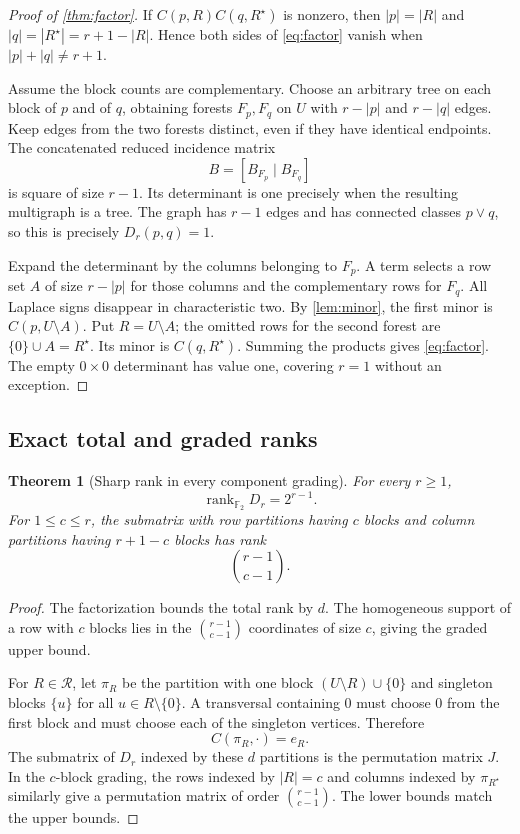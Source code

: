 \documentclass[11pt,a4paper]{article}
\newtheorem{theorem}{Theorem}[section]
\theoremstyle{definition}
\theoremstyle{remark}
\newcommand{\F}{\mathbb F_2}
\newcommand{\rk}{\operatorname{rank}}
\begin{document}
\begin{proof}[Proof of \cref{thm:factor}]
If $C(p,R)C(q,R^\star)$ is nonzero, then
$|p|=|R|$ and $|q|=|R^\star|=r+1-|R|$. Hence both sides of
\eqref{eq:factor} vanish when $|p|+|q|\ne r+1$.

Assume the block counts are complementary. Choose an arbitrary tree on each block
of $p$ and of $q$, obtaining forests $F_p,F_q$ on $U$ with $r-|p|$ and
$r-|q|$ edges. Keep edges from the two forests distinct, even if they have identical
endpoints. The concatenated reduced incidence matrix
\[
                         B=[B_{F_p}\mid B_{F_q}]
\]
is square of size $r-1$. Its determinant is one precisely when the resulting
multigraph is a tree. The graph has $r-1$ edges and has connected classes
$p\vee q$, so this is precisely $D_r(p,q)=1$.

Expand the determinant by the columns belonging to $F_p$. A term selects a row set
$A$ of size $r-|p|$ for those columns and the complementary rows for $F_q$.
All Laplace signs disappear in characteristic two. By \cref{lem:minor}, the first
minor is $C(p,U\setminus A)$. Put $R=U\setminus A$; the omitted rows for the
second forest are $\{0\}\cup A=R^\star$. Its minor is $C(q,R^\star)$.
Summing the products gives \eqref{eq:factor}. The empty $0\times0$ determinant
has value one, covering $r=1$ without an exception.
\end{proof}

\subsection{Exact total and graded ranks}
\begin{theorem}[Sharp rank in every component grading]\label{thm:rank}
For every $r\ge1$,
\begin{equation}
 \rk_{\F}D_r=2^{r-1}.
 \label{eq:rank}
\end{equation}
For $1\le c\le r$, the submatrix with row partitions having $c$ blocks and
column partitions having $r+1-c$ blocks has rank
\begin{equation}
                         \binom{r-1}{c-1}.
                         \label{eq:graded}
\end{equation}
\end{theorem}
\begin{proof}
The factorization bounds the total rank by $d$. The homogeneous support of a row
with $c$ blocks lies in the $\binom{r-1}{c-1}$ coordinates of size $c$, giving the
graded upper bound.

For $R\in\mathcal R$, let $\pi_R$ be the partition with one block
$(U\setminus R)\cup\{0\}$ and singleton blocks $\{u\}$ for all
$u\in R\setminus\{0\}$. A transversal containing $0$ must choose $0$ from the
first block and must choose each of the singleton vertices. Therefore
\[
                         C(\pi_R,\cdot)=e_R.
\]
The submatrix of $D_r$ indexed by these $d$ partitions is the permutation matrix
$J$. In the $c$-block grading, the rows indexed by $|R|=c$ and columns indexed by
$\pi_{R^\star}$ similarly give a permutation matrix of order
$\binom{r-1}{c-1}$. The lower bounds match the upper bounds.
\end{proof}
\end{document}
